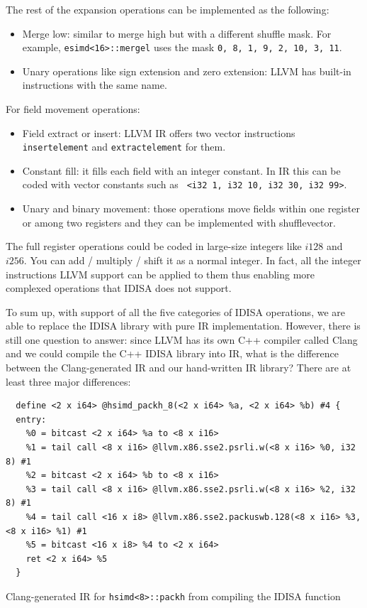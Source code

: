 The rest of the expansion operations can be implemented as the following:
\begin{itemize}
    \item Merge low: similar to merge high but with a different shuffle mask. For example, {\tt esimd<16>::mergel} uses the mask {\tt 0, 8, 1, 9, 2, 10, 3, 11}.
    \item Unary operations like sign extension and zero extension: LLVM has built-in instructions with the same name.
\end{itemize}

For field movement operations:
\begin{itemize}
    \item Field extract or insert: LLVM IR offers two vector instructions {\tt insertelement} and {\tt extractelement} for them.
    \item Constant fill: it fills each field with an integer constant. In IR this can be coded with vector constants such as {\tt <4 x i32> <i32 1, i32 10, i32 30, i32 99>}.
    \item Unary and binary movement: those operations move fields within one register or among two registers and they can be implemented with shufflevector.
\end{itemize}

The full register operations could be coded in large-size integers like $i128$ and $i256$. You can add / multiply / shift it as a normal integer. In fact, all the integer instructions LLVM support can be applied to them thus enabling more complexed operations that IDISA does not support.

To sum up, with support of all the five categories of IDISA operations, we are able to replace the IDISA library with pure IR implementation. However, there is still one question to answer: since LLVM has its own C++ compiler called Clang and we could compile the C++ IDISA library into IR, what is the difference between the Clang-generated IR and our hand-written IR library? There are at least three major differences:

\begin{program}
\begin{verbatim}
  define <2 x i64> @hsimd_packh_8(<2 x i64> %a, <2 x i64> %b) #4 {
  entry:
    %0 = bitcast <2 x i64> %a to <8 x i16>
    %1 = tail call <8 x i16> @llvm.x86.sse2.psrli.w(<8 x i16> %0, i32 8) #1
    %2 = bitcast <2 x i64> %b to <8 x i16>
    %3 = tail call <8 x i16> @llvm.x86.sse2.psrli.w(<8 x i16> %2, i32 8) #1
    %4 = tail call <16 x i8> @llvm.x86.sse2.packuswb.128(<8 x i16> %3, <8 x i16> %1) #1
    %5 = bitcast <16 x i8> %4 to <2 x i64>
    ret <2 x i64> %5
  }
\end{verbatim}
\caption{Clang-generated IR for {\tt hsimd<8>::packh} from compiling the IDISA function}
\label{prog:packh_8_sse2_llvm}
\end{program}

